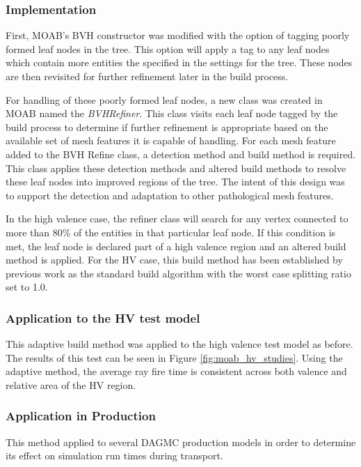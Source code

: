 \subsubsection{Implementation}\label{subsec:adaptive_construction_implementation}

First, MOAB's BVH constructor was modified with the option of tagging poorly
formed leaf nodes in the tree. This option will apply a tag to any leaf nodes
which contain more entities the specified in the settings for the tree. These
nodes are then revisited for further refinement later in the build process.

For handling of these poorly formed leaf nodes, a new class was created in MOAB
named the \textit{BVHRefiner}. This class visits each leaf node tagged by the
build process to determine if further refinement is appropriate based on the
available set of mesh features it is capable of handling. For each mesh feature
added to the BVH Refine class, a detection method and build method is
required. This class applies these detection methods and altered build methods
to resolve these leaf nodes into improved regions of the tree. The intent of
this design was to support the detection and adaptation to other pathological mesh
features.

In the high valence case, the refiner class will search for any vertex connected
to more than 80\% of the entities in that particular leaf node. If this condition
is met, the leaf node is declared part of a high valence region and an altered
build method is applied. For the HV case, this build method has been established
by previous work as the standard build algorithm with the worst case splitting
ratio set to 1.0.

\subsubsection{Application to the HV test model}

This adaptive build method was applied to the high valence test model as
before. The results of this test can be seen in Figure
\ref{fig:moab_hv_studies}. Using the adaptive method, the average ray fire
time is consistent across both valence and relative area of the HV region.

\subsubsection{Application in Production}

This method applied to several DAGMC production models in order to determine
its effect on simulation run times during transport.

